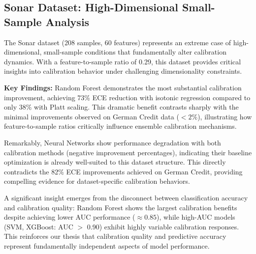 \documentclass[12pt, a4paper]{article}
\begin{document}
\subsection{Sonar Dataset: High-Dimensional Small-Sample Analysis}\label{sec:SonarResults}

The Sonar dataset (208 samples, 60 features) represents an extreme case of high-dimensional, small-sample conditions that fundamentally alter calibration dynamics. With a feature-to-sample ratio of 0.29, this dataset provides critical insights into calibration behavior under challenging dimensionality constraints.

\textbf{Key Findings:} Random Forest demonstrates the most substantial calibration improvement, achieving 73\% ECE reduction with isotonic regression compared to only 38\% with Platt scaling. This dramatic benefit contrasts sharply with the minimal improvements observed on German Credit data ($<2\%$), illustrating how feature-to-sample ratios critically influence ensemble calibration mechanisms.

Remarkably, Neural Networks show performance degradation with both calibration methods (negative improvement percentages), indicating their baseline optimization is already well-suited to this dataset structure. This directly contradicts the 82\% ECE improvements achieved on German Credit, providing compelling evidence for dataset-specific calibration behaviors.

A significant insight emerges from the disconnect between classification accuracy and calibration quality: Random Forest shows the largest calibration benefits despite achieving lower AUC performance ($\approx 0.85$), while high-AUC models (SVM, XGBoost: AUC $>$ 0.90) exhibit highly variable calibration responses. This reinforces our thesis that calibration quality and predictive accuracy represent fundamentally independent aspects of model performance.
\end{document}
